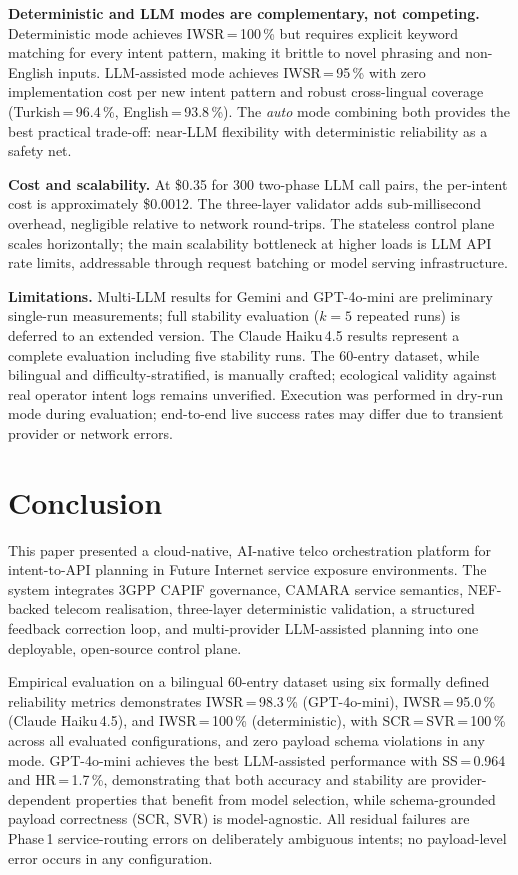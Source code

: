 \documentclass[conference]{IEEEtran}
\begin{document}
\textbf{Deterministic and LLM modes are complementary, not competing.}
Deterministic mode achieves IWSR\,=\,100\,\% but requires explicit
keyword matching for every intent pattern, making it brittle to novel
phrasing and non-English inputs.
LLM-assisted mode achieves IWSR\,=\,95\,\% with zero implementation
cost per new intent pattern and robust cross-lingual coverage
(Turkish\,=\,96.4\,\%, English\,=\,93.8\,\%).
The \textit{auto} mode combining both provides the best practical
trade-off: near-LLM flexibility with deterministic reliability as
a safety net.

\textbf{Cost and scalability.}
At \$0.35 for 300 two-phase LLM call pairs, the per-intent cost is
approximately \$0.0012.
The three-layer validator adds sub-millisecond overhead, negligible
relative to network round-trips.
The stateless control plane scales horizontally; the main
scalability bottleneck at higher loads is LLM API rate limits,
addressable through request batching or model serving infrastructure.

\textbf{Limitations.}
Multi-LLM results for Gemini and GPT-4o-mini are preliminary single-run
measurements; full stability evaluation ($k=5$ repeated runs) is deferred
to an extended version. The Claude Haiku\,4.5 results represent a complete
evaluation including five stability runs.
The 60-entry dataset, while bilingual and difficulty-stratified,
is manually crafted; ecological validity against real operator intent
logs remains unverified.
Execution was performed in dry-run mode during evaluation; end-to-end
live success rates may differ due to transient provider or network errors.

\section{Conclusion}
\label{sec:conclusion}

This paper presented a cloud-native, AI-native telco orchestration
platform for intent-to-API planning in Future Internet service exposure
environments.
The system integrates 3GPP CAPIF governance, CAMARA service semantics,
NEF-backed telecom realisation, three-layer deterministic validation,
a structured feedback correction loop, and multi-provider LLM-assisted
planning into one deployable, open-source control plane.

Empirical evaluation on a bilingual 60-entry dataset using six formally
defined reliability metrics demonstrates IWSR\,=\,98.3\,\% (GPT-4o-mini),
IWSR\,=\,95.0\,\% (Claude Haiku\,4.5), and IWSR\,=\,100\,\% (deterministic),
with SCR\,=\,SVR\,=\,100\,\% across all evaluated configurations,
and zero payload schema violations in any mode.
GPT-4o-mini achieves the best LLM-assisted performance with
SS\,=\,0.964 and HR\,=\,1.7\,\%, demonstrating that both accuracy and
stability are provider-dependent properties that benefit from model
selection, while schema-grounded payload correctness (SCR, SVR) is
model-agnostic.
All residual failures are Phase\,1 service-routing errors on deliberately
ambiguous intents; no payload-level error occurs in any configuration.
\end{document}
